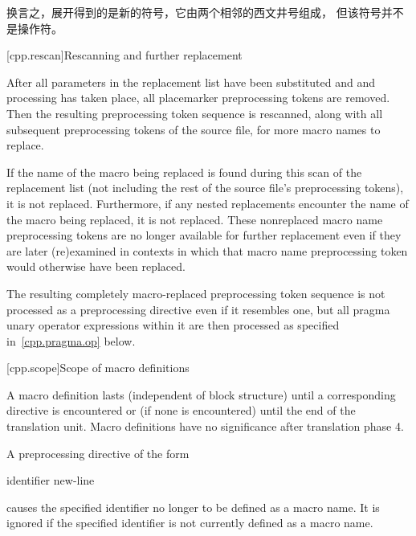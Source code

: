 换言之，展开得到的是新的符号，它由两个相邻的西文井号组成，
但该符号并不是\tcode{\#\#}操作符。\exitexample

[cpp.rescan]{Rescanning and further replacement}%
%

\pnum
After all parameters in the replacement list have been substituted and \tcode{\#} and \tcode{\#\#} processing has taken
place, all placemarker preprocessing tokens are removed. Then
the resulting preprocessing token sequence is rescanned, along with all
subsequent preprocessing tokens of the source file, for more macro names
to replace.

\pnum
If the name of the macro being replaced is found during this scan of
the replacement list
(not including the rest of the source file's preprocessing tokens),
it is not replaced.
Furthermore,
if any nested replacements encounter the name of the macro being replaced,
it is not replaced.
These nonreplaced macro name preprocessing tokens are no longer available
for further replacement even if they are later (re)examined in contexts
in which that macro name preprocessing token would otherwise have been
replaced.

\pnum
The resulting completely macro-replaced preprocessing token sequence
is not processed as a preprocessing directive even if it resembles one,
but all pragma unary operator expressions within it are then processed as
specified in~\ref{cpp.pragma.op} below.

[cpp.scope]{Scope of macro definitions}%
%

\pnum
A macro definition lasts
(independent of block structure)
until a corresponding
directive is encountered or
(if none is encountered)
until the end of the translation unit.
Macro definitions have no significance after translation phase 4.

\pnum
A preprocessing directive of the form

\begin{ncsimplebnf}
 identifier new-line
%
\end{ncsimplebnf}

causes the specified identifier no longer to be defined as a macro name.
It is ignored if the specified identifier is not currently defined as
a macro name.

